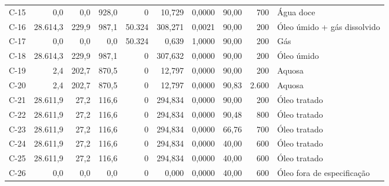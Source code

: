 \documentclass[11pt,a4paper]{article}
\numberwithin{equation}{section}
\numberwithin{table}{section}
\numberwithin{figure}{section}
\begin{document}
{\begin{longtable}{lrrrrrrrrL{2.5cm}}
C-15 & 0,0 & 0,0 & 928,0 & 0 & 10,729 & 0,0000 & 90,00 & 700 & {\scriptsize Água doce}\\
C-16 & 28.614,3 & 229,9 & 987,1 & 50.324 & 308,271 & 0,0021 & 90,00 & 200 & {\scriptsize Óleo úmido + gás dissolvido}\\
C-17 & 0,0 & 0,0 & 0,0 & 50.324 & 0,639 & 1,0000 & 90,00 & 200 & {\scriptsize Gás}\\
C-18 & 28.614,3 & 229,9 & 987,1 & 0 & 307,632 & 0,0000 & 90,00 & 200 & {\scriptsize Óleo úmido}\\
C-19 & 2,4 & 202,7 & 870,5 & 0 & 12,797 & 0,0000 & 90,00 & 200 & {\scriptsize Aquosa}\\
C-20 & 2,4 & 202,7 & 870,5 & 0 & 12,797 & 0,0000 & 90,83 & 2.600 & {\scriptsize Aquosa}\\
C-21 & 28.611,9 & 27,2 & 116,6 & 0 & 294,834 & 0,0000 & 90,00 & 200 & {\scriptsize Óleo tratado}\\
C-22 & 28.611,9 & 27,2 & 116,6 & 0 & 294,834 & 0,0000 & 90,48 & 800 & {\scriptsize Óleo tratado}\\
C-23 & 28.611,9 & 27,2 & 116,6 & 0 & 294,834 & 0,0000 & 66,76 & 700 & {\scriptsize Óleo tratado}\\
C-24 & 28.611,9 & 27,2 & 116,6 & 0 & 294,834 & 0,0000 & 40,00 & 600 & {\scriptsize Óleo tratado}\\
C-25 & 28.611,9 & 27,2 & 116,6 & 0 & 294,834 & 0,0000 & 40,00 & 600 & {\scriptsize Óleo tratado}\\
C-26 & 0,0 & 0,0 & 0,0 & 0 & 0,000 & 0,0000 & 40,00 & 600 & {\scriptsize Óleo fora de especificação}\\
\bottomrule\end{longtable}}
\end{document}
